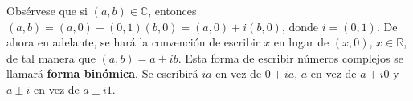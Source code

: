 

\begin{definition}
Obsérvese que si $(a,b) \in \mathbb{C}$, entonces $(a,b) = (a,0) + (0,1)(b,0) = (a,0) + i (b,0)$, donde $i = (0,1)$. De ahora en adelante, se hará la convención de escribir $x$ en lugar de $(x,0)$, $x \in \mathbb{R}$, de tal manera que $(a,b) = a + i b$. Esta forma de escribir números complejos se llamará \textbf{forma binómica}. Se escribirá $i a$ en vez de $0 + i a$, $a$ en vez de $a + i 0$ y $a \pm i$ en vez de $a \pm i 1$.
\end{definition}
